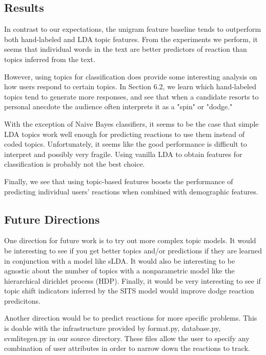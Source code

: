 
\subsection{Results}

In contrast to our expectations, the unigram feature baseline tends to outperform both hand-labeled and LDA topic features. From the experiments we perform, it seems that individual words in the text are better predictors of reaction than topics inferred from the text.

However, using topics for classification does provide some interesting analysis on how users respond to certain topics. In Section 6.2, we learn which hand-labeled topics tend to generate more responses, and see that when a candidate resorts to personal anecdote the audience often interprets it as a "spin" or "dodge."

With the exception of Naive Bayes classifiers, it seems to be the case that simple LDA topics work well enough for predicting reactions to use them instead of coded topics. 
Unfortunately, it seems like the good performance is difficult to interpret and possibly very fragile.
Using vanilla LDA to obtain features for classification is probably not the best choice.

Finally, we see that using topic-based features boosts the performance of predicting individual users' reactions when combined with demographic features.

\subsection{Future Directions}

One direction for future work is to try out more complex topic models.
It would be interesting to see if you get better topics and/or predictions if they are learned in conjunction with a model like sLDA.
It would also be interesting to be agnostic about the number of topics with a nonparametric model like the hierarchical dirichlet process (HDP).
Finally, it would be very interesting to see if topic shift indicators inferred by the SITS model would improve dodge reaction predicitons.

Another direction would be to predict reactions for more specific problems.
This is doable with the infrastructure provided by format.py, database.py, svmlitegen.py in our source directory.
These files allow the user to specify any combination of user attributes in order to narrow down the reactions to track.

